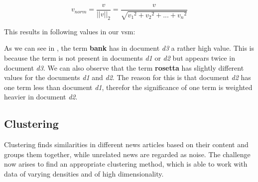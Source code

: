 \begin{equation}
    v_{norm} = \frac{v}{||v||_2} = \frac{v}{\sqrt{v_1{^2}+v_2{^2}+...+v_n{^2}}}
    \label{equ:euclidean}
\end{equation}

This results in following values in our \Gls{vsm}:

\begin{table}[h]
    \centering
    \caption{tf-idf \Gls{vsm}.}
    \label{tab:tfidf_vsm}
\end{table}

As we can see in , the term \textbf{bank} has in document \textit{d3}
a rather high value.
This is because the term is not present in documents \textit{d1} or \textit{d2} but appears
twice in document \textit{d3}.
We can also observe that the term \textbf{rosetta} has slightly different values for the
documents \textit{d1} and \textit{d2}.
The reason for this is that document \textit{d2} has one term less than document \textit{d1},
therefor the significance of one term is weighted heavier in document \textit{d2}.

\subsection{Clustering}
\label{subsec:3_clustering}

Clustering finds similarities in different news articles based on their content and groups them together,
while unrelated news are regarded as noise.
The challenge now arises to find an appropriate clustering method,
which is able to work with data of varying densities and of high dimensionality.

